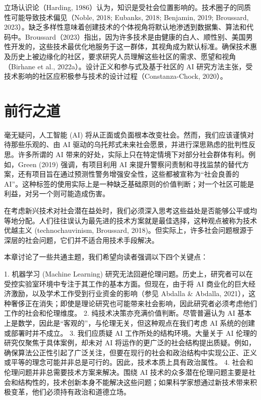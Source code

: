 立场认识论（Harding, 1986）认为，知识是受社会位置影响的。技术圈子的同质性可能导致技术偏见（Noble, 2018; Eubanks, 2018; Benjamin, 2019; Broussard, 2023）。缺乏多样性意味着创建技术的个体视角将默认地渗透到数据集、算法和代码中。Broussard（2023）指出，因为许多技术是由健康的白人、顺性别、美国男性开发的，这些技术最优化地服务于这一群体，其视角成为默认标准。确保技术惠及历史上被边缘化的社区，要求研究人员理解这些社区的需求、愿望和视角（Birhane et al., 2022a）。设计正义和参与式及基于社区的 AI 研究方法主张，受技术影响的社区应积极参与技术的设计过程（Constanza-Chock, 2020）。

\section{前行之道}
毫无疑问，人工智能 (AI) 将从正面或负面根本改变社会。然而，我们应该谨慎对待那些乐观的、由 AI 驱动的乌托邦式未来社会愿景，并进行深思熟虑的批判性反思。许多所谓的 AI 带来的好处，实际上只在特定情境下对部分社会群体有利。例如，Green (2019) 强调，有项目利用 AI 来提升警察问责制和寻找监禁的替代方案，还有项目旨在通过预测性警务增强安全性，这些都被宣称为“社会良善的 AI”。这种标签的使用实际上是一种缺乏基础原则的价值判断；对一个社区可能是利益，对另一个则可能造成伤害。

在考虑新兴技术对社会潜在益处时，我们必须深入思考这些益处是否能够公平或均等地分配。人们往往误认为最先进的技术方案就是最佳选择，这种观点被称为技术优越主义 (technochauvinism, Broussard, 2018)。但实际上，许多社会问题根源于深层的社会问题，它们并不适合用技术手段解决。

本章讨论了一些共通主题，我们希望向读者强调以下四个关键点：

1. 机器学习 (Machine Learning) 研究无法回避伦理问题。历史上，研究者可以在受控实验室环境中专注于其工作的基本方面。但现在，由于将 AI 商业化的巨大经济激励，以及学术工作受到行业资金的影响（参见 Abdalla \& Abdalla, 2021），这种奢侈正在消失；即使是理论研究也可能带来社会影响，因此研究者必须考虑他们工作的社会和伦理维度。
2. 纯技术决策亦充满价值判断。尽管普遍认为 AI 基本上是数学，因此是“客观的”，与伦理无关，但这种观点在我们考虑 AI 系统的创建或部署时并不成立。
3. 我们应质疑 AI 工作所处的结构环境。大量关于 AI 伦理的研究仅聚焦于具体案例，却未对 AI 将运作的更广泛的社会结构提出质疑。例如，确保算法公正性引起了广泛关注，但要在现行的社会和政治结构中实现公正、正义或平等的理念可能并非总是可行的。因此，技术本质上具有政治属性。
4. 社会和伦理问题并非总需要技术方案来解决。围绕 AI 技术的众多潜在伦理问题主要是社会和结构性的，技术创新本身不能解决这些问题；如果科学家想通过新技术带来积极变革，他们必须持有政治和道德立场。

